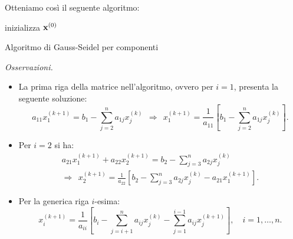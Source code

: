 Otteniamo così il seguente algoritmo: \\
\begin{algo}
	inizializza $\mathbf{x}^{(0)}$\;
	\caption{Algoritmo di Gauss-Seidel per componenti}
\end{algo}
\textit{Osservazioni.}
\begin{itemize}
\item La prima riga della matrice nell'algoritmo, ovvero per $i=1$, presenta la seguente soluzione:
\begin{equation*}
a_{11} x^{( k+1)}_{1} =b_{1} -\sum\limits ^{n}_{j=2} a_{1j} x^{(k)}_{j} \ \ \Rightarrow \ \ x^{( k+1)}_{1} =\frac{1}{a_{11}}\left[ b_{1} -\sum\limits ^{n}_{j=2} a_{1j} x^{(k)}_{j}\right].
\end{equation*}
\item Per $i=2$ si ha:
\begin{gather*}
a_{21} x^{( k+1)}_{1} +a_{22} x^{( k+1)}_{2} =b_{2} -\sum\limits ^{n}_{j=3} a_{2j} x^{(k)}_{j}\\
\Rightarrow \ \ x^{( k+1)}_{2} =\frac{1}{a_{22}}\left[ b_{2} -\sum\limits ^{n}_{j=3} a_{2j} x^{(k)}_{j} -a_{21} x^{( k+1)}_{1}\right].
\end{gather*}
\item Per la generica riga $i$-esima:
\begin{equation*}
x^{( k+1)}_{i} =\frac{1}{a_{ii}}\left[ b_{i} -\sum\limits ^{n}_{j=i+1} a_{ij} x^{(k)}_{j} -\sum ^{i-1}_{j=1} a_{ij} x^{( k+1)}_{j}\right] ,\quad i=1,\dotsc ,n.
\end{equation*}
\end{itemize}

